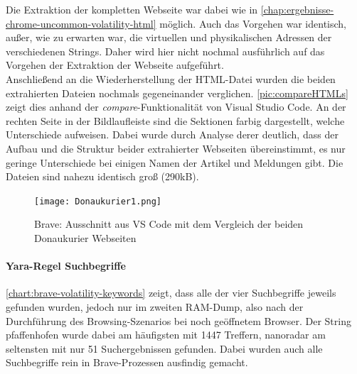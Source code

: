 Die Extraktion der kompletten Webseite war dabei wie in \autoref{chap:ergebnisse-chrome-uncommon-volatility-html} möglich. Auch das Vorgehen war identisch, außer, wie zu erwarten war, die virtuellen und physikalischen Adressen der verschiedenen Strings. Daher wird hier nicht nochmal ausführlich auf das Vorgehen der Extraktion der Webseite aufgeführt.\\
Anschließend an die Wiederherstellung der HTML-Datei wurden die beiden extrahierten Dateien nochmals gegeneinander verglichen. \autoref{pic:compareHTMLs} zeigt dies anhand der \textit{compare}-Funktionalität von Visual Studio Code. An der rechten Seite in der Bildlaufleiste sind die Sektionen farbig dargestellt, welche Unterschiede aufweisen. Dabei wurde durch Analyse derer deutlich, dass der Aufbau und die Struktur beider extrahierter Webseiten übereinstimmt, es nur geringe Unterschiede bei einigen Namen der Artikel und Meldungen gibt. Die Dateien sind nahezu identisch groß (290kB).

\begin{figure}[h!]
	\centering
	\texttt{[image: Donaukurier1.png]}
	\caption{Brave: Ausschnitt aus VS Code mit dem Vergleich der beiden Donaukurier Webseiten}
	\label{pic:compareHTMLs}
\end{figure}

\paragraph*{Yara-Regel \glqq{}Suchbegriffe\grqq{}}\label{chap:ergebnisse-brave-uncommon-locations-volatility-suchbegriffe}  

\autoref{chart:brave-volatility-keywords} zeigt, dass alle der vier Suchbegriffe jeweils gefunden wurden, jedoch nur im zweiten RAM-Dump, also nach der Durchführung des Browsing-Szenarios bei noch geöffnetem Browser. Der String \glqq{}pfaffenhofen\grqq{} wurde dabei am häufigsten mit 1447 Treffern, \glqq{}nanoradar\grqq{} am seltensten mit nur 51 Suchergebnissen gefunden. Dabei wurden auch alle Suchbegriffe rein in Brave-Prozessen ausfindig gemacht.

